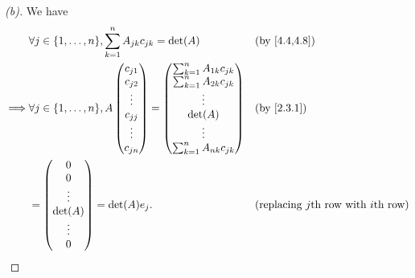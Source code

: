 \begin{proof}[(b)]
	We have
	\begin{align*}
		         & \forall j \in \set{1, \dots, n}, \sum_{k = 1}^n A_{j k} c_{j k} = \det(A) &  & \by{4.4,4.8}                                      \\
		\implies & \forall j \in \set{1, \dots, n}, A \begin{pmatrix}
			                                              c_{j 1} \\
			                                              c_{j 2} \\
			                                              \vdots  \\
			                                              c_{j j} \\
			                                              \vdots  \\
			                                              c_{j n}
		                                              \end{pmatrix} = \begin{pmatrix}
			                                                              \sum_{k = 1}^n A_{1 k} c_{j k} \\
			                                                              \sum_{k = 1}^n A_{2 k} c_{j k} \\
			                                                              \vdots                         \\
			                                                              \det(A)                        \\
			                                                              \vdots                         \\
			                                                              \sum_{k = 1}^n A_{n k} c_{j k}
		                                                              \end{pmatrix}                        &  & \by{2.3.1}                          \\
		         & = \begin{pmatrix}
			             0       \\
			             0       \\
			             \vdots  \\
			             \det(A) \\
			             \vdots  \\
			             0
		             \end{pmatrix} = \det(A) e_j.                                              &  & \text{(replacing \(j\)th row with \(i\)th row)}
	\end{align*}
\end{proof}

